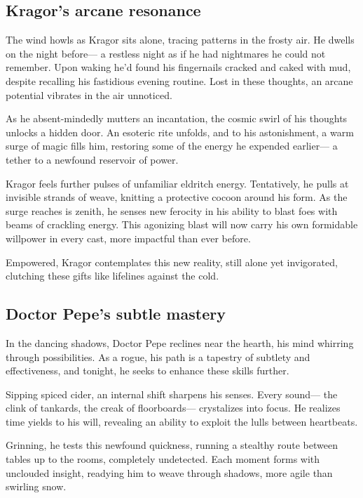 \documentclass[
  letterpaper,12pt,twoside,twocolumn,openany,
  nodeprecatedcode,bg=full]{dndbook}
\begin{document}
\subsection{Kragor's arcane resonance}\label{kragors-arcane-resonance}

The wind howls as Kragor sits alone, tracing patterns in the frosty air.
He dwells on the night before--- a restless night as if he had
nightmares he could not remember. Upon waking he'd found his fingernails
cracked and caked with mud, despite recalling his fastidious evening
routine. Lost in these thoughts, an arcane potential vibrates in the air
unnoticed.

As he absent-mindedly mutters an incantation, the cosmic swirl of his
thoughts unlocks a hidden door. An esoteric rite unfolds, and to his
astonishment, a warm surge of magic fills him, restoring some of the
energy he expended earlier--- a tether to a newfound reservoir of power.

Kragor feels further pulses of unfamiliar eldritch energy. Tentatively,
he pulls at invisible strands of weave, knitting a protective cocoon
around his form. As the surge reaches is zenith, he senses new ferocity
in his ability to blast foes with beams of crackling energy. This
agonizing blast will now carry his own formidable willpower in every
cast, more impactful than ever before.

Empowered, Kragor contemplates this new reality, still alone yet
invigorated, clutching these gifts like lifelines against the cold.

\subsection{Doctor Pepe's subtle
mastery}\label{doctor-pepes-subtle-mastery}

In the dancing shadows, Doctor Pepe reclines near the hearth, his mind
whirring through possibilities. As a rogue, his path is a tapestry of
subtlety and effectiveness, and tonight, he seeks to enhance these
skills further.

Sipping spiced cider, an internal shift sharpens his senses. Every
sound--- the clink of tankards, the creak of floorboards--- crystalizes
into focus. He realizes time yields to his will, revealing an ability to
exploit the lulls between heartbeats.

Grinning, he tests this newfound quickness, running a stealthy route
between tables up to the rooms, completely undetected. Each moment forms
with unclouded insight, readying him to weave through shadows, more
agile than swirling snow.
\end{document}
